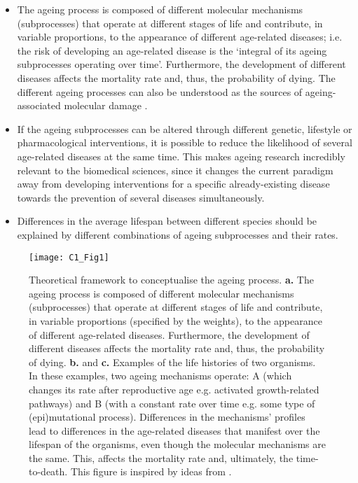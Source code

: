 \begin{itemize}
	
	\item The ageing process is composed of different molecular mechanisms (subprocesses) that operate at different stages of life and contribute, in variable proportions, to the appearance of different age-related diseases; i.e. the risk of developing an age-related disease is the `integral of its ageing subprocesses operating over time'. Furthermore, the development of different diseases affects the mortality rate and, thus, the probability of dying. The different ageing processes can also be understood as the sources of ageing-associated molecular damage \cite{Lopez-Otin2013}.
	
	\item If the ageing subprocesses can be altered through different genetic, lifestyle or pharmacological interventions, it is possible to reduce the likelihood of several age-related diseases at the same time. This makes ageing research incredibly relevant to the biomedical sciences, since it changes the current paradigm away from developing interventions for a specific already-existing disease towards the prevention of several diseases simultaneously.
	
	\item  Differences in the average lifespan between different species should be explained by different combinations of ageing subprocesses and their rates.
		
\end{itemize}	

\begin{figure}[htbp!] 
	\centering    
	\texttt{[image: C1\_Fig1]}
	\vspace*{1 mm}
	\caption[Theoretical framework to conceptualise the ageing process]{Theoretical framework to conceptualise the ageing process. \textbf{a.} The ageing process is composed of different molecular mechanisms (subprocesses) that operate at different stages of life and contribute, in variable proportions (specified by the weights), to the appearance of different age-related diseases. Furthermore, the development of different diseases affects the mortality rate and, thus, the probability of dying. \textbf{b.} and \textbf{c.} Examples of the life histories of two organisms. In these examples, two ageing mechanisms operate: A (which changes its rate after reproductive age e.g. activated growth-related pathways) and B (with a constant rate over time e.g. some type of (epi)mutational process). Differences in the mechanisms' profiles lead to differences in the age-related diseases that manifest over the lifespan of the organisms, even though the molecular mechanisms are the same. This, affects the mortality rate and, ultimately, the time-to-death. This figure is inspired by ideas from \cite{Hayflick2007,Gems2015,Peto1997,Stroustrup2016,Freund2019}.}
	\label{fig:c1_fig1}
\end{figure}

